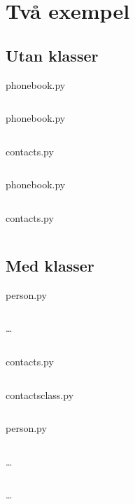 \mode*

\section{Två exempel}

\subsection{Utan klasser}

\begin{frame}[fragile]
  phonebook.py \hrulefill
  \inputminted[linenos]{python}{examples/phonebook.py}
\end{frame}

\begin{frame}[fragile]
  phonebook.py \hrulefill
  \inputminted[linenos,firstline=5,lastline=6]{python}{examples/phonebook.py}
  \vfill
  contacts.py \hrulefill
  \inputminted[linenos,firstline=5,lastline=16]{python}{examples/contacts.py}
\end{frame}

\begin{frame}[fragile]
  phonebook.py \hrulefill
  \inputminted[linenos,firstline=13,lastline=13]{python}{examples/phonebook.py}
  \vfill
  contacts.py \hrulefill
  \inputminted[linenos,firstline=25,lastline=35]{python}{examples/contacts.py}
\end{frame}

\subsection{Med klasser}

\begin{frame}[fragile]
  person.py \hrulefill
  \inputminted[linenos,firstline=3,lastline=15]{python}{examples/person.py}
  \dots
  \inputminted[linenos,firstline=65,lastline=68]{python}{examples/person.py}
\end{frame}

\begin{frame}[fragile]
  contacts.py \hrulefill
  \inputminted[linenos,firstline=3,lastline=9]{python}{examples/contacts.py}
  \vfill
  contacts\textunderscore{}class.py \hrulefill
  \inputminted[linenos,firstline=3,lastline=9]{python}{examples/contacts_class.py}
\end{frame}

\begin{frame}[fragile]
  person.py \hrulefill
  \inputminted[linenos,firstline=3,lastline=4]{python}{examples/person.py}
  \dots
  \inputminted[autogobble=false,linenos,firstline=17,lastline=23]{python}{examples/person.py}
  \dots
  \inputminted[autogobble=false,linenos,firstline=65,lastline=70]{python}{examples/person.py}
\end{frame}

